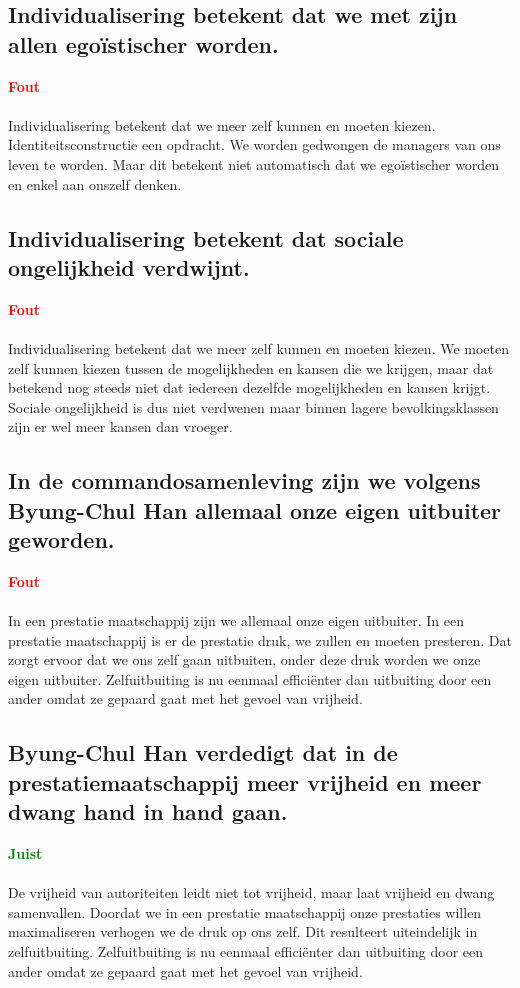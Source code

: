 \documentclass[11pt,a4paper,titlepage]{article}
\begin{document}
\subsection{Individualisering betekent dat we met zijn allen egoïstischer worden.}
\textcolor{red}{\textbf{Fout}}\\\\
Individualisering betekent dat we meer zelf kunnen en moeten kiezen. Identiteitsconstructie een opdracht. We worden gedwongen de managers van ons leven te worden. Maar dit betekent niet automatisch dat we egoïstischer worden en enkel aan onszelf denken.

\subsection{Individualisering betekent dat sociale ongelijkheid verdwijnt.}
\textcolor{red}{\textbf{Fout}}\\\\
Individualisering betekent dat we meer zelf kunnen en moeten kiezen. We moeten zelf kunnen kiezen tussen de mogelijkheden en kansen die we krijgen, maar dat betekend nog steeds niet dat iedereen dezelfde mogelijkheden en kansen krijgt. Sociale ongelijkheid is dus niet verdwenen maar binnen lagere bevolkingsklassen zijn er wel meer kansen dan vroeger.

\subsection{In de commandosamenleving zijn we volgens Byung-Chul Han allemaal onze eigen uitbuiter geworden.}
\textcolor{red}{\textbf{Fout}}\\\\
In een prestatie maatschappij zijn we allemaal onze eigen uitbuiter. In een prestatie maatschappij is er de prestatie druk, we zullen en moeten presteren. Dat zorgt ervoor dat we ons zelf gaan uitbuiten, onder deze druk worden we onze eigen uitbuiter. Zelfuitbuiting is nu eenmaal efficiënter dan uitbuiting door een ander omdat ze gepaard gaat met het gevoel van vrijheid.

\subsection{Byung-Chul Han verdedigt dat in de prestatiemaatschappij meer vrijheid en meer dwang hand in hand gaan.}
\textcolor{green}{\textbf{Juist}}\\\\
De vrijheid van autoriteiten leidt niet tot vrijheid, maar laat vrijheid en dwang samenvallen. Doordat we in een prestatie maatschappij onze prestaties willen maximaliseren verhogen we de druk op ons zelf. Dit resulteert uiteindelijk in zelfuitbuiting. Zelfuitbuiting is nu eenmaal efficiënter dan uitbuiting door een ander omdat ze gepaard gaat met het gevoel van vrijheid.
\end{document}
